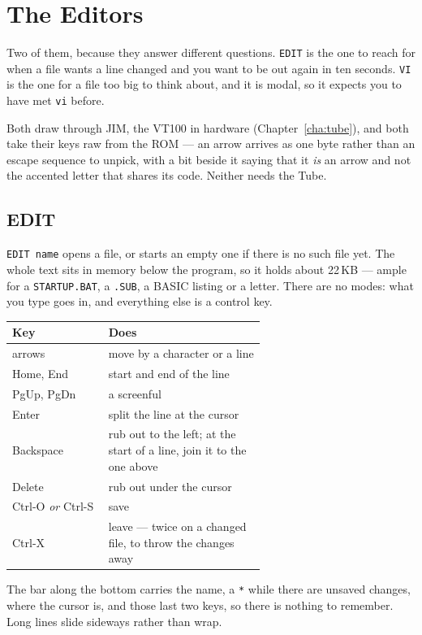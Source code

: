 \chapter{The Editors}\label{cha:editors}

Two of them, because they answer different questions. \verb|EDIT| is the
one to reach for when a file wants a line changed and you want to be out
again in ten seconds. \verb|VI| is the one for a file too big to think
about, and it is modal, so it expects you to have met \texttt{vi} before.

Both draw through JIM, the VT100 in hardware (Chapter~\ref{cha:tube}), and
both take their keys raw from the ROM --- an arrow arrives as one byte
rather than an escape sequence to unpick, with a bit beside it saying
that it \emph{is} an arrow and not the accented letter that shares its
code. Neither needs the Tube.

\section{EDIT}
\verb|EDIT name| opens a file, or starts an empty one if there is no such
file yet. The whole text sits in memory below the program, so it holds
about 22\,KB --- ample for a \texttt{STARTUP.BAT}, a \texttt{.SUB}, a
BASIC listing or a letter. There are no modes: what you type goes in,
and everything else is a control key.

\begin{center}
\small
\begin{tabular}{@{}l >{\raggedright\arraybackslash}p{0.62\linewidth}@{}}
\toprule
\textbf{Key} & \textbf{Does} \\
\midrule
arrows & move by a character or a line \\
Home, End & start and end of the line \\
PgUp, PgDn & a screenful \\
Enter & split the line at the cursor \\
Backspace & rub out to the left; at the start of a line, join it to the one above \\
Delete & rub out under the cursor \\
Ctrl-O \emph{or} Ctrl-S & save \\
Ctrl-X & leave --- twice on a changed file, to throw the changes away \\
\bottomrule
\end{tabular}
\end{center}

The bar along the bottom carries the name, a \verb|*| while there are
unsaved changes, where the cursor is, and those last two keys, so there is
nothing to remember. Long lines slide sideways rather than wrap.


